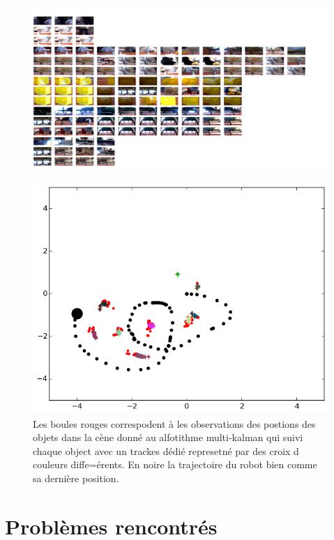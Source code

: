 \begin{figure}[H]
	\includegraphics[width=\textwidth]{multi_recon.png}
	\caption{}	
	\label{fig:multi_map}
\end{figure}

\begin{figure}[H]
	\includegraphics[width=\textwidth]{map.png}
	\caption{Les boules rouges correspodent à les observations des postions des objets dans la cène donné au alfotithme multi-kalman qui suivi chaque object avec un trackes dédié represetné par des croix d couleurs diffe=érents. En noire la trajectoire du robot bien comme sa dernière position.}	
	\label{fig:multi_map}
\end{figure}

\section{Problèmes rencontrés}

